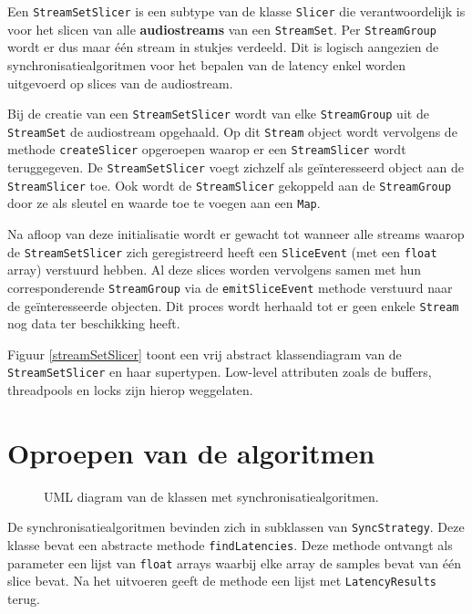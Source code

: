Een \texttt{StreamSetSlicer} is een subtype van de klasse \texttt{Slicer} die verantwoordelijk is voor het slicen van alle \textbf{audiostreams} van een \texttt{StreamSet}. Per \texttt{StreamGroup} wordt er dus maar één stream in stukjes verdeeld. Dit is logisch aangezien de synchronisatiealgoritmen voor het bepalen van de latency enkel worden uitgevoerd op slices van de audiostream.

Bij de creatie van een \texttt{StreamSetSlicer} wordt van elke \texttt{StreamGroup} uit de \texttt{StreamSet} de audiostream opgehaald. Op dit \texttt{Stream} object wordt vervolgens de methode \texttt{createSlicer} opgeroepen waarop er een \texttt{StreamSlicer} wordt teruggegeven. De \texttt{StreamSetSlicer} voegt zichzelf als geïnteresseerd object aan de \texttt{StreamSlicer} toe. Ook wordt de \texttt{StreamSlicer}
gekoppeld aan de \texttt{StreamGroup} door ze als sleutel en waarde toe te voegen aan een \texttt{Map}.

Na afloop van deze initialisatie wordt er gewacht tot wanneer alle streams waarop de \texttt{StreamSetSlicer} zich geregistreerd heeft een \texttt{SliceEvent} (met een \texttt{float} array) verstuurd hebben. Al deze slices worden vervolgens samen met hun corresponderende \texttt{StreamGroup} via de \texttt{emitSliceEvent} methode verstuurd naar de geïnteresseerde objecten. Dit proces wordt herhaald tot er geen enkele \texttt{Stream} nog data ter beschikking heeft.

Figuur \ref{streamSetSlicer} toont een vrij abstract klassendiagram van de \texttt{StreamSetSlicer} en haar supertypen. Low-level attributen zoals de buffers, threadpools en locks zijn hierop weggelaten.

\section*{Oproepen van de algoritmen}

\begin{figure}[h!]
	\captionsetup{width=0.7\textwidth}
	\caption{UML diagram van de klassen met synchronisatiealgoritmen.}
	\begin{center}
		\advance\parskip0.3cm
		
	\end{center}
	\label{SyncStrategyUML}
\end{figure}

De synchronisatiealgoritmen bevinden zich in subklassen van \texttt{SyncStrategy}. Deze klasse bevat een abstracte methode \texttt{findLatencies}. Deze methode ontvangt als parameter een lijst van \texttt{float} arrays waarbij elke array de samples bevat van één slice bevat. Na het uitvoeren geeft de methode een lijst met \texttt{LatencyResults} terug.

